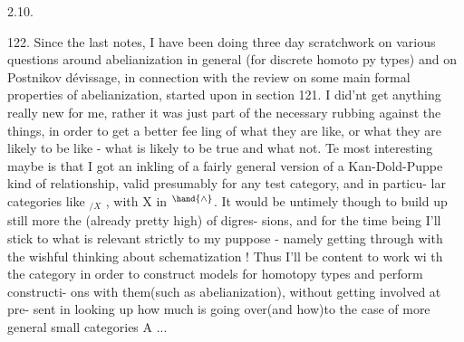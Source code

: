 
2.10.

122. Since the last notes, I have been doing three day  scratchwork
on various questions around abelianization in general (for discrete homoto%
py types) and on Postnikov dévissage, in connection with the review on
some main formal properties of abelianization, started upon in  section 
121. I did'nt get anything really new for me, rather it was just part of
the necessary rubbing against the things, in order to get a better fee\hand{-}%
ling of what they are like, or what  they are likely to be like
- what is likely to be true\hand{,} and what not. Te most interesting maybe is
that I got an inkling of a fairly general version of a Kan-Dold-Puppe kind
of relationship,  valid presumably for any  test category, and in particu-%
lar   categories like \hand{$\Delta$}$_{/X}$ , with X in \hand{$\Delta$}$^{\hand{\wedge}}$. It would be untimely 
though to build up still more the (already pretty high)   of digres-%
sions, and for the time being I'll stick to what is relevant strictly
to my   puppose - namely getting through with the wishful thinking
about schematization ! Thus I'll be content to work wi th the category
\hand{$\Delta$} in order to construct models for homotopy types and perform constructi-%
ons with them(such as abelianization), without getting involved at pre-%
sent  in looking up  how much is going over(and how)to the case of
more general small categories A ...

